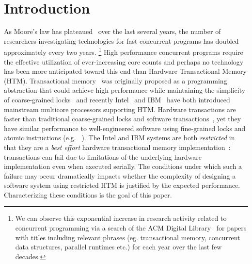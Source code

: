 \section{Introduction}


As Moore's law has plateaued~\cite{Vardi14} over the
last several years, the number of researchers investigating 
technologies for fast concurrent programs has doubled 
approximately every two years.
\footnote{We can observe this exponential increase in
research activity related to concurrent programming
via a search of the ACM Digital Library~\cite{ACM}
for papers with titles including relevant phrases
(eg. transactional memory, concurrent data structures, parallel runtimes etc.)
for each year over the last few decades.} 
High performance concurrent programs require the effective utilization of 
ever-increasing core counts and perhaps no technology
has been more anticipated toward this end than Hardware 
Transactional Memory (HTM).  
Transactional memory~\cite{HerlihyMo93} was originally
proposed as a programming abstraction that could achieve
high performance while maintaining the simplicity of 
coarse-grained locks~\cite{YooHuLa13} and recently 
Intel~\cite{Reinders12,IntelISAX12} and
IBM~\cite{CainMiFr13,Merritt11,IBMPower8Overview14} have both
introduced mainstream multicore processors 
supporting  HTM.  
Hardware transactions are faster than traditional
coarse-grained locks and software
transactions~\cite{YooHuLa13,CascavalBlMi08}, 
yet they have similar
performance to well-engineered software using fine-grained 
locks and atomic instructions (e.g.
~\cite{Herlihy91}). 
The Intel and IBM
systems are both \emph{restricted} in that they are 
a \emph{best effort} hardware transactional memory
implementation~\cite{Roman12,IntelISAX12,CainMiFr13,IBMPower8Optimization14}:
transactions can fail due to limitations
of the underlying hardware implementation even when 
executed serially.  The conditions
under which such a failure may occur dramatically impacts
whether the complexity of designing a software 
system using restricted HTM
is justified by the expected performance.  Characterizing
these conditions is the goal of this paper. 

